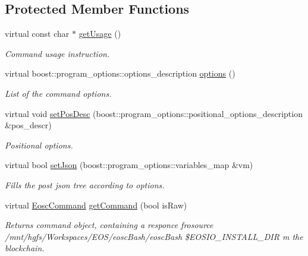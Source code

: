 \subsection*{Protected Member Functions}
\begin{DoxyCompactItemize}
\item 
virtual const char $\ast$ \hyperlink{classtokenika_1_1eosc_1_1_command_options_a18ada0ba1163f7a41c9990ae2756012b}{get\+Usage} ()
\begin{DoxyCompactList}\small\item\em Command \textquotesingle{}usage\textquotesingle{} instruction. \end{DoxyCompactList}\item 
virtual boost\+::program\+\_\+options\+::options\+\_\+description \hyperlink{classtokenika_1_1eosc_1_1_command_options_aa55960f380250eb7065cb6489b67196f}{options} ()
\begin{DoxyCompactList}\small\item\em List of the command options. \end{DoxyCompactList}\item 
virtual void \hyperlink{classtokenika_1_1eosc_1_1_command_options_ae2e98c683ae1eb3e5af1e81e60020447}{set\+Pos\+Desc} (boost\+::program\+\_\+options\+::positional\+\_\+options\+\_\+description \&pos\+\_\+descr)
\begin{DoxyCompactList}\small\item\em Positional options. \end{DoxyCompactList}\item 
virtual bool \hyperlink{classtokenika_1_1eosc_1_1_command_options_a7aecc9aa79ca65f6abbd568ff8ff77a7}{set\+Json} (boost\+::program\+\_\+options\+::variables\+\_\+map \&vm)
\begin{DoxyCompactList}\small\item\em Fills the post json tree according to options. \end{DoxyCompactList}\item 
virtual \hyperlink{classtokenika_1_1eosc_1_1_eosc_command}{Eosc\+Command} \hyperlink{classtokenika_1_1eosc_1_1_command_options_a787f15164e2055394d9d948c07bf201c}{get\+Command} (bool is\+Raw)
\begin{DoxyCompactList}\small\item\em Returns command object, containing a responce frosource /mnt/hgfs/\+Workspaces/\+E\+O\+S/eosc\+Bash/eosc\+Bash \$\+E\+O\+S\+I\+O\+\_\+\+I\+N\+S\+T\+A\+L\+L\+\_\+\+D\+IR m the blockchain. \end{DoxyCompactList}\item 

\end{DoxyCompactItemize}
